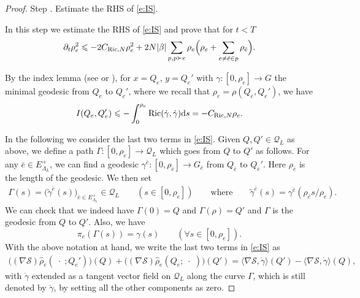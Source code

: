 \documentclass[11pt,UTF-8,reqno]{amsart}
\numberwithin{equation}{section}
\def\p{\partial}
\def\<{{\langle}}
\def\>{{\rangle}}
\def\Ric{{\rm Ricci}}
\def\dif{{\mathord{{\rm d}}}}
\def\cQ{{\mathcal Q}}
\def\cS{{\mathcal S}}
\def\leq{\leqslant}
\def\p{\partial}
\def\<{{\langle}}
\def\>{{\rangle}}
\def\Ric{{\rm Ric}}
\def\dif{{\mathord{{\rm d}}}}
\def\leq{\leqslant}
\def\<{\langle} \def\>{\rangle}
\begin{document}
\begin{proof}
	
	{\sc Step} .\label{MM2} Estimate the RHS of  \eqref{e:IS}.
	
	
In this step we estimate the RHS of  \eqref{e:IS} and prove that for $t<T$
\begin{align}\label{b:rhoe}
	\p_t \rho_e^2
	\leq
	-2C_{\Ric,N} \rho_e^2
	+2N|\beta| \sum_{p,p\succ e}\rho_e
	\Big(\rho_e+\sum_{e\neq \bar e\in p}\rho_{\bar e}\Big).
	\end{align}

	
	By the index lemma  (see \cite[Theorem 2.1.4]{Wang} or \cite[Lemma 6.7.1]{Hsu}),
 for $x=Q_e$, $y=Q_e'$ with $\gamma:[0,\rho_e]\to G$ the minimal geodesic  from $Q_e$ to $Q_e'$, where we recall
 that $\rho_e = \rho(Q_e,Q_e')$,  we have
	\begin{align}\label{eq:zb1}
		I(Q_e,Q_e')\leq -\int_0^{\rho_e}\Ric(\dot \gamma,\dot \gamma)\dif s=-C_{\Ric,N}\rho_e.
	\end{align}
	
In the following we consider the last two terms in \eqref{e:IS}.
Given $Q,Q'\in \cQ_L$ as above, we define a path $\Gamma: [0,\rho_e]\to \cQ_L$
which goes from $Q$ to $Q'$
as follows.
For any ${\bar e}\in E^+_{\Lambda_{L}}$, we can find a geodesic $\gamma^{\bar e} : [0,\rho_{\bar e}] \to G_{\bar e}$
from $Q_{\bar e} $ to $Q_{\bar e}'$. Here $\rho_{\bar e}$ is the length of the geodesic.
 We then set
\begin{align*}
	\Gamma(s)  =  \Big(\tilde\gamma^{\bar e}(s)\Big)_{\bar e\in E^+_{\Lambda_{L}}} \in \cQ_L
	\qquad  (s\in [0,\rho_e])
	\qquad
	\mbox{where}
	\qquad
	\tilde\gamma^{\bar e} (s) = \gamma^{\bar e} (\rho_{\bar e} s / \rho_e).
\end{align*}
We can check that we indeed have
$\Gamma(0) = Q$ and $\Gamma(\rho) = Q'$ and $\Gamma$ is the geodesic from $Q$ to $Q'$. Also, we have
$$
\pi_e (\Gamma(s)) = \gamma(s)\qquad  (\forall s\in [0,\rho_e]).
$$
With the above notation at hand, we write the last two terms in \eqref{e:IS} as
\begin{align}\label{dsds}
\Big((\nabla \cS)\hat\rho_e(\; \cdot \; ; Q_e')\Big)(Q)
	+\Big((\nabla \cS)\hat\rho_e(Q_e; \; \cdot\;)\Big)(Q')
	=
	\<\nabla \cS,\dot \gamma\>(Q')-\<\nabla \cS,\dot\gamma\>(Q),
\end{align}
with $\dot \gamma$ extended as a tangent vector  field on  $\cQ_L$ along the curve $\Gamma$,
which is still denoted by $\dot \gamma$, by setting all the other components as zero.



\end{proof}
\end{document}
